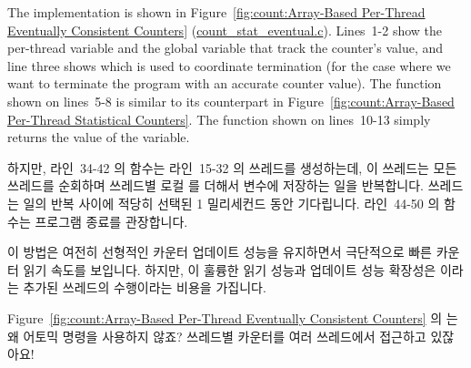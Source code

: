 The implementation is shown in
Figure~\ref{fig:count:Array-Based Per-Thread Eventually Consistent Counters}
(\url{count_stat_eventual.c}).
Lines~1-2 show the per-thread variable and the global variable that
track the counter's value, and line three shows 
which is used to coordinate termination (for the case where we want
to terminate the program with an accurate counter value).
The  function shown on lines~5-8 is similar to its
counterpart in
Figure~\ref{fig:count:Array-Based Per-Thread Statistical Counters}.
The  function shown on lines~10-13 simply returns the
value of the  variable.
\fi

하지만, 라인~34-42 의  함수는 라인~15-32 의 
쓰레드를 생성하는데, 이 쓰레드는 모든 쓰레드를 순회하며 쓰레드별 로컬
 를 더해서  변수에 저장하는 일을 반복합니다.
 쓰레드는 일의 반복 사이에 적당히 선택된 1 밀리세컨드 동안
기다립니다.
라인~44-50 의  함수는 프로그램 종료를 관장합니다.

이 방법은 여전히 선형적인 카운터 업데이트 성능을 유지하면서 극단적으로 빠른
카운터 읽기 속도를 보입니다.
하지만, 이 훌륭한 읽기 성능과 업데이트 성능 확장성은  이라는
추가된 쓰레드의 수행이라는 비용을 가집니다.

\QuickQuiz{}
	Figure~\ref{fig:count:Array-Based Per-Thread Eventually Consistent
	Counters} 의  는 왜 어토믹 명령을 사용하지 않죠?
	쓰레드별 카운터를 여러 쓰레드에서 접근하고 있잖아요!
	\iffalse

